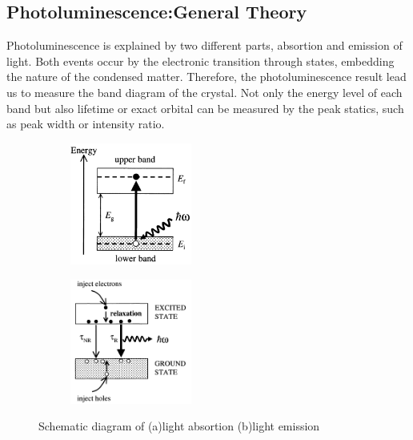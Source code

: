 \documentclass{article}
\begin{document}
\subsection{Photoluminescence:General Theory}
 \label{intro:pl_general_theory}
 Photoluminescence is explained by two different parts, absortion and emission of light.
 Both events occur by the electronic transition through states, embedding the nature of the condensed matter.
 Therefore, the photoluminescence result lead us to measure the band diagram of the crystal.
 Not only the energy level of each band but also lifetime or exact orbital can be measured by the peak statics, such as peak width or intensity ratio.
 \begin{figure}[ht]
    \centering
    \begin{subfigure}[b]{6cm}
        \centering
        \includegraphics[width=4cm]{../results/intro_energy_absortion.png}
        \caption{}
    \end{subfigure}
    \hfill
    \begin{subfigure}[b]{6cm}
        \centering
        \includegraphics[width=4cm]{../results/intro_energy_emission.png}
        \caption{}
    \end{subfigure}
    \hfill
    \caption{Schematic diagram of (a)light absortion (b)light emission \cite{condensed_matter_optics}}
    \label{fig:pl_intro}
 \end{figure}
\end{document}
